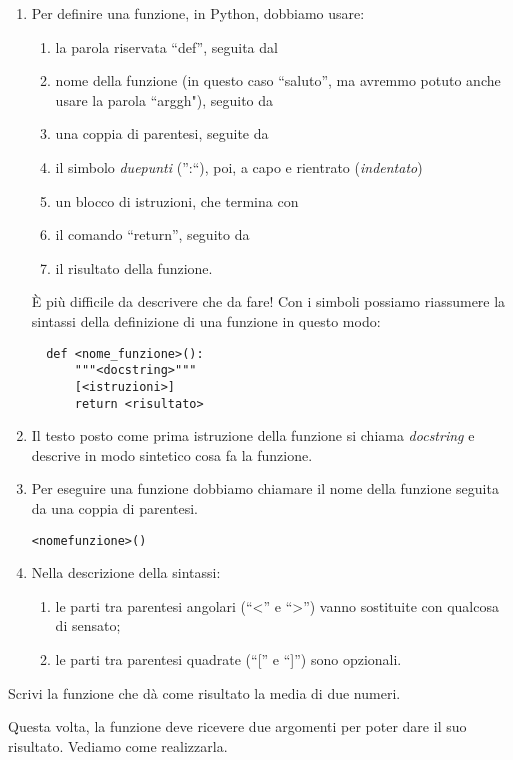\begin{osservazione}
\begin{enumerate} [nosep]
\item Per definire una funzione, in Python,  dobbiamo usare:
\begin{enumerate} [noitemsep]
\item la parola riservata  ``def'', seguita dal
\item nome della funzione (in questo caso  ``saluto'', ma avremmo potuto 
anche usare la parola  ``arggh"), seguito da
\item una coppia di parentesi, seguite da
\item il simbolo \emph{duepunti} ('':``), poi, a capo e rientrato 
(\emph{indentato})
\item un blocco di istruzioni, che termina con
\item il comando  ``return'', seguito da
\item il risultato della funzione.
\end{enumerate}

È più difficile da descrivere che da fare!
Con i simboli possiamo riassumere la sintassi della definizione di una 
funzione in questo modo:
\begin{lstlisting}
  def <nome_funzione>():
      """<docstring>"""
      [<istruzioni>]
      return <risultato>
\end{lstlisting}

\item Il testo posto come prima istruzione della funzione si chiama 
\emph{docstring} e descrive in modo sintetico cosa fa la funzione.
\item Per eseguire una funzione dobbiamo chiamare il nome della funzione 
seguita da una coppia di parentesi.
\begin{lstlisting}
<nomefunzione>()
\end{lstlisting}
\item Nella descrizione della sintassi:
\begin{enumerate} [nosep]
\item le parti tra parentesi angolari (``<'' e  ``>'') vanno sostituite 
con qualcosa di sensato;
\item le parti tra parentesi quadrate (``['' e  ``]'') sono opzionali.
\end{enumerate}
\end{enumerate}
\end{osservazione}

\begin{esempio}
 Scrivi la funzione che dà come risultato la media di due numeri.

Questa volta, la funzione deve ricevere due argomenti per poter dare il suo 
risultato. Vediamo come realizzarla.


\end{esempio}

